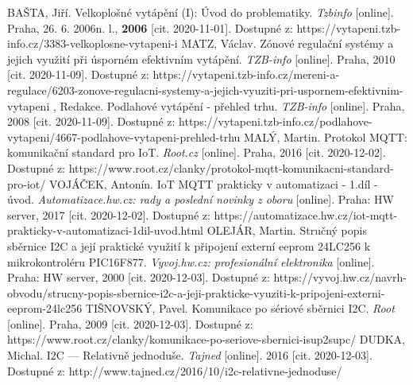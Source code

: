 \begin{thebibliography}{3}
BAŠTA, Jiří. Velkoplošné vytápění (I): Úvod do problematiky. \textit{Tzbinfo} [online]. Praha, 26. 6. 2006n. l., \textbf{2006} [cit. 2020-11-01]. Dostupné z: https://vytapeni.tzb-info.cz/3383-velkoplosne-vytapeni-i
MATZ, Václav. Zónové regulační systémy a jejich využití při úsporném efektivním vytápění. \textit{TZB-info} [online]. Praha, 2010 [cit. 2020-11-09]. Dostupné z: https://vytapeni.tzb-info.cz/mereni-a-regulace/6203-zonove-regulacni-systemy-a-jejich-vyuziti-pri-uspornem-efektivnim-vytapeni
, Redakce. Podlahové vytápění - přehled trhu. \textit{TZB-info} [online]. Praha, 2008 [cit. 2020-11-09]. Dostupné z: https://vytapeni.tzb-info.cz/podlahove-vytapeni/4667-podlahove-vytapeni-prehled-trhu
MALÝ, Martin. Protokol MQTT: komunikační standard pro IoT. \textit{Root.cz} [online]. Praha, 2016 [cit. 2020-12-02]. Dostupné z: https://www.root.cz/clanky/protokol-mqtt-komunikacni-standard-pro-iot/
VOJÁČEK, Antonín. IoT MQTT prakticky v automatizaci - 1.díl - úvod. \textit{Automatizace.hw.cz: rady a poslední novinky z oboru} [online]. Praha: HW server, 2017 [cit. 2020-12-02]. Dostupné z: https://automatizace.hw.cz/iot-mqtt-prakticky-v-automatizaci-1dil-uvod.html
OLEJÁR, Martin. Stručný popis sběrnice I2C a její praktické využití k připojení externí eeprom 24LC256 k mikrokontroléru PIC16F877. \textit{Vyvoj.hw.cz: profesionální elektronika} [online]. Praha: HW server, 2000 [cit. 2020-12-03]. Dostupné z: https://vyvoj.hw.cz/navrh-obvodu/strucny-popis-sbernice-i2c-a-jeji-prakticke-vyuziti-k-pripojeni-externi-eeprom-24lc256
TIŠNOVSKÝ, Pavel. Komunikace po sériové sběrnici I2C. \textit{Root} [online]. Praha, 2009 [cit. 2020-12-03]. Dostupné z: https://www.root.cz/clanky/komunikace-po-seriove-sbernici-isup2supc/
DUDKA, Michal. I2C --- Relativně jednoduše. \textit{Tajned} [online]. 2016 [cit. 2020-12-03]. Dostupné z: http://www.tajned.cz/2016/10/i2c-relativne-jednoduse/



\end{thebibliography}
